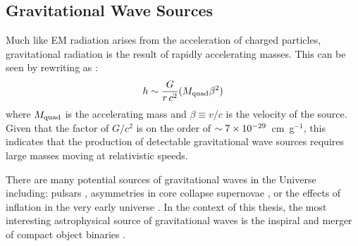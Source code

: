 \subsection{Gravitational Wave Sources}
\label{sec:intro_gw_source}
Much like EM radiation arises from the acceleration of charged particles, gravitational radiation is the result of rapidly accelerating masses. This can be seen by rewriting  as \citep{Centrella+10}:
\begin{equation}
\label{eq:intro_quad}
h \apx \frac{G}{r\,c^2} (M_{\rm quad} \beta^2)
\end{equation}
\noindent where $M_{\rm quad}$ is the accelerating mass and $\beta \equiv v / c$ is the velocity of the source. Given that the factor of $G / c^2$ is on the order of $\sim7\times10^{-29}$~cm~g$^{-1}$, this indicates that the production of detectable gravitational wave sources requires large masses moving at relativistic speeds.

There are many potential sources of gravitational waves in the Universe \citep[see e.g,][]{CutlerThorne02} including: pulsars \citep{Hewish+68, Jaranowski+98}, asymmetries in core collapse supernovae \citep[SN;][]{Dimmelmeier+01,Ott+06,Ott2009}, or the effects of inflation in the very early universe \citep{Turner1997,Maggiore2000}. In the context of this thesis, the most interesting astrophysical source of gravitational waves is the inspiral and merger of compact object binaries \citep[see e.g.,][]{Belczynski+02,Blanchet2002,Blanchet2006}.


